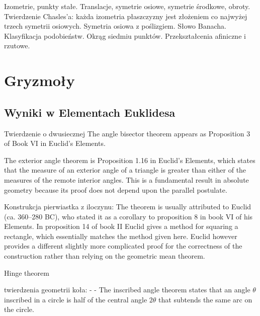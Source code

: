 \documentclass{parchment}
\begin{document}
Izometrie, punkty stałe.
Translacje, symetrie osiowe, symetrie środkowe, obroty.
Twierdzenie Chasles'a: każda izometria płaszczyzny jest złożeniem co najwyżej trzech symetrii osiowych.
Symetria osiowa z poślizgiem.
Słowo Banacha.
Klasyfikacja podobieństw.
Okrąg siedmiu punktów. %
Przekształcenia afiniczne i rzutowe.



\chapter{Gryzmoły}




\section{Wyniki w Elementach Euklidesa}


Twierdzenie o dwusiecznej %
The angle bisector theorem appears as Proposition 3 of Book VI in Euclid's Elements. 

The exterior angle theorem is Proposition 1.16 in Euclid's Elements, which states that the measure of an exterior angle of a triangle is greater than either of the measures of the remote interior angles. This is a fundamental result in absolute geometry because its proof does not depend upon the parallel postulate. %

Konstrukcja pierwiastka z iloczynu:
The theorem is usually attributed to Euclid (ca. 360–280 BC), who stated it as a corollary to proposition 8 in book VI of his Elements. In proposition 14 of book II Euclid gives a method for squaring a rectangle, which essentially matches the method given here. Euclid however provides a different slightly more complicated proof for the correctness of the construction rather than relying on the geometric mean theorem.


Hinge theorem %

twierdzenia geometrii koła:
- %
- The inscribed angle theorem states that an angle $\theta$ inscribed in a circle is half of the central angle $2\theta$ that subtends the same arc on the circle. 
\end{document}
